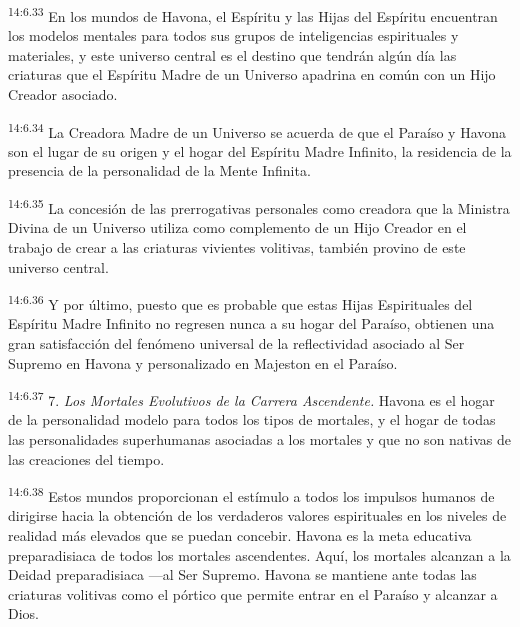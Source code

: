 \par
\textsuperscript{14:6.33} En los mundos de Havona, el Espíritu y las Hijas del Espíritu encuentran los modelos mentales para todos sus grupos de inteligencias espirituales y materiales, y este universo central es el destino que tendrán algún día las criaturas que el Espíritu Madre de un Universo apadrina en común con un Hijo Creador asociado.

\par
\textsuperscript{14:6.34} La Creadora Madre de un Universo se acuerda de que el Paraíso y Havona son el lugar de su origen y el hogar del Espíritu Madre Infinito, la residencia de la presencia de la personalidad de la Mente Infinita.

\par
\textsuperscript{14:6.35} La concesión de las prerrogativas personales como creadora que la Ministra Divina de un Universo utiliza como complemento de un Hijo Creador en el trabajo de crear a las criaturas vivientes volitivas, también provino de este universo central.

\par
\textsuperscript{14:6.36} Y por último, puesto que es probable que estas Hijas Espirituales del Espíritu Madre Infinito no regresen nunca a su hogar del Paraíso, obtienen una gran satisfacción del fenómeno universal de la reflectividad asociado al Ser Supremo en Havona y personalizado en Majeston en el Paraíso.

\par
\textsuperscript{14:6.37} 7. \textit{Los Mortales Evolutivos de la Carrera Ascendente.} Havona es el hogar de la personalidad modelo para todos los tipos de mortales, y el hogar de todas las personalidades superhumanas asociadas a los mortales y que no son nativas de las creaciones del tiempo.

\par
\textsuperscript{14:6.38} Estos mundos proporcionan el estímulo a todos los impulsos humanos de dirigirse hacia la obtención de los verdaderos valores espirituales en los niveles de realidad más elevados que se puedan concebir. Havona es la meta educativa preparadisiaca de todos los mortales ascendentes. Aquí, los mortales alcanzan a la Deidad preparadisiaca ---al Ser Supremo. Havona se mantiene ante todas las criaturas volitivas como el pórtico que permite entrar en el Paraíso y alcanzar a Dios.


